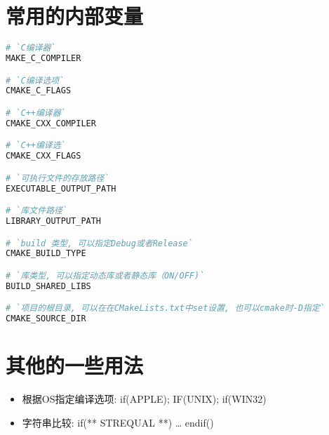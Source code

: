 \section{\ZHH 常用的内部变量}{
\begin{lstlisting}[language=bash]
# `C编译器`
MAKE_C_COMPILER

# `C编译选项`
CMAKE_C_FLAGS

# `C++编译器`
CMAKE_CXX_COMPILER

# `C++编译选`
CMAKE_CXX_FLAGS

# `可执行文件的存放路径`
EXECUTABLE_OUTPUT_PATH

# `库文件路径`
LIBRARY_OUTPUT_PATH

# `build 类型, 可以指定Debug或者Release`
CMAKE_BUILD_TYPE

# `库类型, 可以指定动态库或者静态库（ON/OFF)`
BUILD_SHARED_LIBS

# `项目的根目录, 可以在在CMakeLists.txt中set设置, 也可以cmake时-D指定`
CMAKE_SOURCE_DIR
\end{lstlisting}
}

\section{\ZHH 其他的一些用法}{
\begin {itemize}
\item { 根据OS指定编译选项: if(APPLE); IF(UNIX); if(WIN32) }\par
\item { 字符串比较: if(** STREQUAL **) … endif() }\par
\end {itemize}
}

